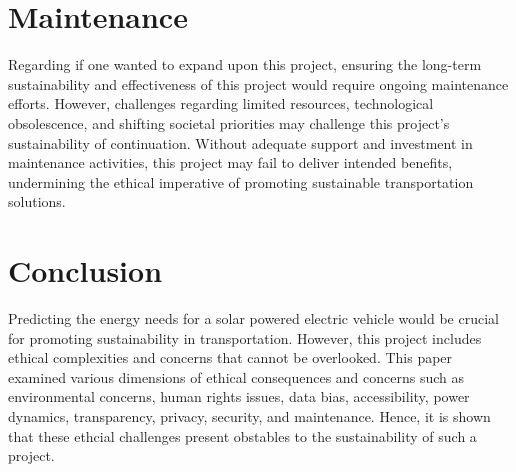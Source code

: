 \documentclass[10pt,twocolumn]{article}
\begin{document}
\section{Maintenance}
Regarding if one wanted to expand upon this project, ensuring the long-term sustainability and effectiveness of this project would require ongoing maintenance efforts. However, challenges regarding limited resources, technological obsolescence, and shifting societal priorities may challenge this project's sustainability of continuation. Without adequate support and investment in maintenance activities, this project may fail to deliver intended benefits, undermining the ethical imperative of promoting sustainable transportation solutions.
\section{Conclusion}
Predicting the energy needs for a solar powered electric vehicle would be crucial for promoting sustainability in transportation. However, this project includes ethical complexities and concerns that cannot be overlooked. This paper examined various dimensions of ethical consequences and concerns such as environmental concerns, human rights issues, data bias, accessibility, power dynamics, transparency, privacy, security, and maintenance. Hence, it is shown that these ethcial challenges present obstables to the sustainability of such a project. 
\newpage
\end{document}
